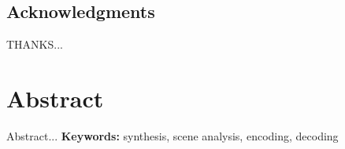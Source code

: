 \documentclass[a4paper,11pt,final]{ThesisStyle}
\begin{document}

\dominitoc
{}
 \cleardoublepage
 
 





\section*{Acknowledgments}
THANKS...








\chapter*{Abstract}
Abstract... 
{\large\textbf{Keywords:}}
synthesis, scene analysis, encoding, decoding

\cleardoublepage


\end{document}
